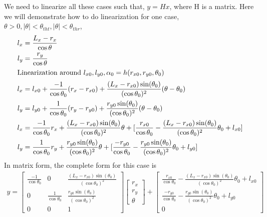 \documentclass[12pt, letterpaper]{amsart} %
\numberwithin{equation}{section}
\begin{document}
\\
\\
We need to linearize all these cases such that, $y = H x$, where H is a matrix. Here we will demonstrate how to do linearization for one case, $\theta >0, |\theta| < \theta_{tht}, |\theta| < \theta_{thr}$,
\begin{align*}
  l_x &= \frac{L_x - r_x}{\cos \theta} \\
  l_y &= \frac{r_y}{\cos \theta} \\
  \intertext{Linearization around $l_{x0}, l_{y0}, \alpha_{0} = h(r_{x0}, r_{y0}, \theta_0)$}
  l_x &= l_{x0} + \frac{-1}{\cos \theta_0} (r_x - r_{x0}) + \frac{(L_x - r_{x0})\sin(\theta_0)}{(\cos{\theta_0})^2} (\theta - \theta_0) \\
  l_y &= l_{y0} + \frac{1}{\cos \theta_0}(r_y - r_{y0}) + \frac{r_{y0} \sin(\theta_0)}{(\cos \theta_0)^2} (\theta - \theta_0) \\
  l_x &= \frac{-1}{\cos \theta_0} r_x + \frac{(L_x - r_{x0})\sin(\theta_0)}{(\cos{\theta_0})^2} \theta + [\frac{r_{x0}}{\cos \theta_0} - \frac{(L_x - r_{x0})\sin(\theta_0)}{(\cos{\theta_0})^2}\theta_0 + l_{x0}] \\
  l_y &= \frac{1}{\cos \theta_0}r_y + \frac{r_{y0} \sin(\theta_0)}{(\cos \theta_0)^2} \theta + [\frac{-r_{y0}}{\cos \theta_0} - \frac{r_{y0} \sin(\theta_0)}{(\cos \theta_0)^2} \theta_0 + l_{y0}]
\end{align*}
In matrix form, the complete form for this case is
\begin{align*}
  y =
  \begin{bmatrix}
    \frac{-1}{\cos \theta_0} & 0 & \frac{(L_x - r_{x0})\sin(\theta_0)}{(\cos{\theta_0})^2} \\
    0 & \frac{1}{\cos \theta_0} & \frac{r_{y0} \sin(\theta_0)}{(\cos \theta_0)^2} \\
    0 & 0 & 1
  \end{bmatrix}
            \begin{bmatrix}
              r_x \\
              r_y \\
              \theta
            \end{bmatrix}
            +
            \begin{bmatrix}
              \frac{r_{x0}}{\cos \theta_0} - \frac{(L_x - r_{x0})\sin(\theta_0)}{(\cos{\theta_0})^2}\theta_0 + l_{x0} \\
              \frac{-r_{y0}}{\cos \theta_0} - \frac{r_{y0} \sin(\theta_0)}{(\cos \theta_0)^2} \theta_0 + l_{y0} \\
              0
            \end{bmatrix}
\end{align*}
\end{document}
